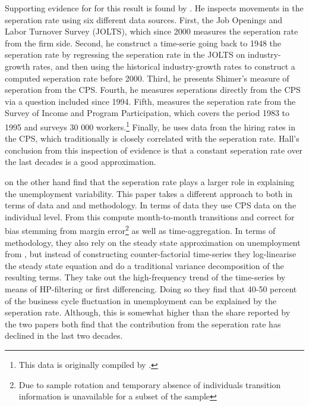 Supporting evidence for for this result is found by \cite{Hall2005}. He inspects movements in the seperation rate using six different data sources. First, the Job Openings and Labor Turnover Survey (JOLTS), which since 2000 measures the seperation rate from the firm side. Second, he construct a time-serie going back to 1948 the seperation rate by regressing the seperation rate in the JOLTS on  industry-growth rates, and then using the historical industry-growth rates to construct a computed seperation rate before 2000. Third, he presents Shimer's measure of seperation from the CPS. Fourth, he measures seperations directly from the CPS via a question included since 1994. Fifth, measures the seperation rate from the Survey of Income and Program Participation, which covers the period 1983 to 1995 and surveys 30 000 workers.\footnote{This data is originally compiled by \cite{Gottschalk2000}.} Finally, he uses data from the hiring rates in the CPS, which traditionally is closely correlated with the seperation rate.  Hall's conclusion from this inspection of evidence is that a constant seperation rate over the last decades is a good approximation. %

\cite{Fujita2008} on the other hand find that the seperation rate plays a larger role in explaining the unemployment variability. This paper takes a different approach to \cite{Shimer2012} both in terms of data and and methodology. In terms of data they use CPS data on the individual level. From this compute month-to-month transitions and correct for bias stemming from margin error\footnote{Due to sample rotation and temporary absence of individuals transition information is unavailable for a subset of the sample} as well as time-aggregation. In terms of methodology, they also rely on the steady state approximation on unemployment from \cite{Shimer2012}, but instead of constructing counter-factorial time-series they log-linearise the steady state equation and do a traditional variance decomposition of the resulting terms. They take out the high-frequency trend of the time-series by means of HP-filtering or first differencing. Doing so they find that 40-50 percent of the business cycle fluctuation in unemployment can be explained by the seperation rate. Although, this is somewhat higher than the share reported by \cite{Shimer2012} the two papers both find that the contribution from the seperation rate has declined in the last two decades.

